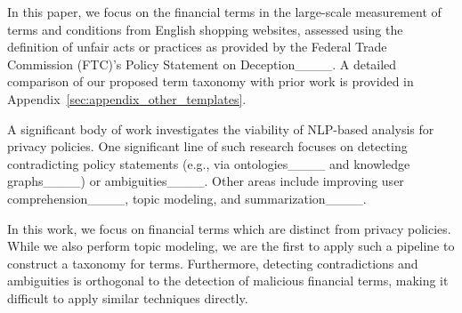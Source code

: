 In this paper, we focus on the financial terms in the large-scale measurement of terms and conditions from English shopping websites, assessed using the definition of unfair acts or practices as provided by the Federal Trade Commission (FTC)'s Policy Statement on Deception____. A detailed comparison of our proposed term taxonomy with prior work is provided in Appendix~\ref{sec:appendix_other_templates}.

A significant body of work investigates the viability of NLP-based analysis for privacy policies. One significant line of such research focuses on detecting contradicting policy statements (e.g., via ontologies____ and knowledge graphs____) or ambiguities____. Other areas include improving user comprehension____, topic modeling, and summarization____.

In this work, we focus on financial terms which are distinct from privacy policies. While we also perform topic modeling, we are the first to apply such a pipeline to construct a taxonomy for \termname terms. Furthermore, detecting contradictions and ambiguities is orthogonal to the detection of malicious financial terms, making it difficult to apply similar techniques directly.